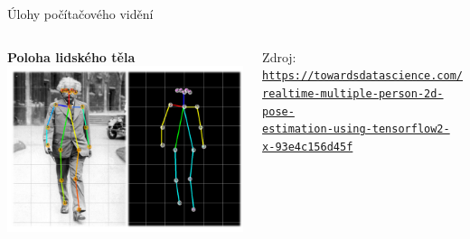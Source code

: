 \documentclass[aspectratio=169,dvipsnames]{beamer}
\begin{document}
\begin{frame}{Úlohy počítačového vidění}
{\begin{columns}[t]
        \centering \textbf{Poloha lidského těla} \\[1ex]
        \includegraphics[width=.98\textwidth]{img/pose_detection.png} \\

        \begin{minipage}{\textwidth}
        \tiny Zdroj: \href{https://towardsdatascience.com/realtime-multiple-person-2d-pose-estimation-using-tensorflow2-x-93e4c156d45f}{\tt https://towardsdatascience.com/\\ realtime-multiple-person-2d-pose- \\ estimation-using-tensorflow2- \\ x-93e4c156d45f}
        \end{minipage}

    \end{columns}}


\end{frame}

\end{document}
